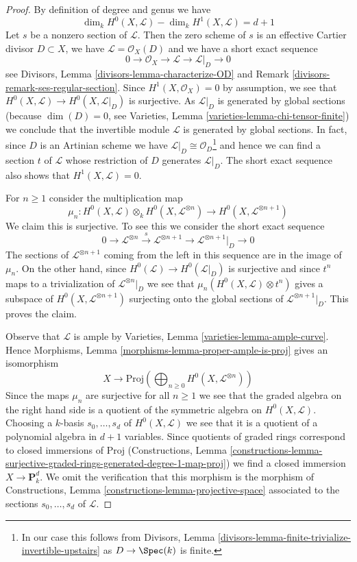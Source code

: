 \begin{proof}
By definition of degree and genus we have
$$
\dim_k H^0(X, \mathcal{L}) - \dim_k H^1(X, \mathcal{L}) = d + 1
$$
Let $s$ be a nonzero section of $\mathcal{L}$.
Then the zero scheme of $s$ is an effective Cartier
divisor $D \subset X$, we have $\mathcal{L} = \mathcal{O}_X(D)$ and
we have a short exact sequence
$$
0 \to \mathcal{O}_X \to \mathcal{L} \to \mathcal{L}|_D \to 0
$$
see Divisors, Lemma \ref{divisors-lemma-characterize-OD} and
Remark \ref{divisors-remark-ses-regular-section}.
Since $H^1(X, \mathcal{O}_X) = 0$ by assumption, we see that
$H^0(X, \mathcal{L}) \to H^0(X, \mathcal{L}|_D)$ is surjective.
As $\mathcal{L}|_D$ is generated by global sections
(because $\dim(D) = 0$, see
Varieties, Lemma \ref{varieties-lemma-chi-tensor-finite})
we conclude that the invertible module $\mathcal{L}$
is generated by global sections.
In fact, since $D$ is an Artinian scheme we have
$\mathcal{L}|_D \cong \mathcal{O}_D$\footnote{In our case this
follows from Divisors, Lemma
\ref{divisors-lemma-finite-trivialize-invertible-upstairs}
as $D \to \Spec(k)$ is finite.} and hence we can
find a section $t$ of $\mathcal{L}$ whose restriction
of $D$ generates $\mathcal{L}|_D$.
The short exact sequence also shows that $H^1(X, \mathcal{L}) = 0$.

\medskip\noindent
For $n \geq 1$ consider the multiplication map
$$
\mu_n :
H^0(X, \mathcal{L}) \otimes_k H^0(X, \mathcal{L}^{\otimes n})
\longrightarrow
H^0(X, \mathcal{L}^{\otimes n + 1})
$$
We claim this is surjective. To see this we consider the short exact
sequence
$$
0 \to \mathcal{L}^{\otimes n} \xrightarrow{s}
\mathcal{L}^{\otimes n + 1} \to \mathcal{L}^{\otimes n + 1}|_D \to 0
$$
The sections of $\mathcal{L}^{\otimes n + 1}$ coming from the left in this
sequence are in the image of $\mu_n$. On the other hand, since
$H^0(\mathcal{L}) \to H^0(\mathcal{L}|_D)$ is surjective and since
$t^n$ maps to a trivialization of $\mathcal{L}^{\otimes n}|_D$
we see that $\mu_n(H^0(X, \mathcal{L}) \otimes t^n)$ gives a subspace
of $H^0(X, \mathcal{L}^{\otimes n + 1})$ surjecting onto the global sections of
$\mathcal{L}^{\otimes n + 1}|_D$. This proves the claim.

\medskip\noindent
Observe that $\mathcal{L}$ is ample by
Varieties, Lemma \ref{varieties-lemma-ample-curve}.
Hence
Morphisms, Lemma \ref{morphisms-lemma-proper-ample-is-proj}
gives an isomorphism
$$
X \longrightarrow
\text{Proj}\left(
\bigoplus\nolimits_{n \geq 0} H^0(X, \mathcal{L}^{\otimes n})\right)
$$
Since the maps $\mu_n$ are surjective for all $n \geq 1$ we see that
the graded algebra on the right hand side is a quotient of
the symmetric algebra on $H^0(X, \mathcal{L})$. Choosing a $k$-basis
$s_0, \ldots, s_d$ of $H^0(X, \mathcal{L})$ we see that
it is a quotient of a polynomial algebra in $d + 1$ variables.
Since quotients of graded rings correspond to closed immersions
of $\text{Proj}$ (Constructions, Lemma
\ref{constructions-lemma-surjective-graded-rings-generated-degree-1-map-proj})
we find a closed immersion $X \to \mathbf{P}^d_k$. We omit the
verification that this morphism is the morphism of
Constructions, Lemma \ref{constructions-lemma-projective-space}
associated to the sections $s_0, \ldots, s_d$ of $\mathcal{L}$.
\end{proof}

